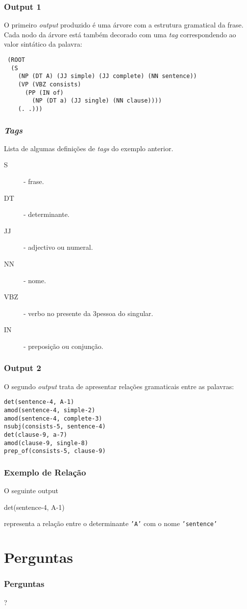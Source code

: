 \documentclass{beamer}
\begin{document}
\begin{frame}\frametitle{Output 1}
O primeiro \emph{output} produzido é uma árvore com a estrutura gramatical da frase. Cada nodo da árvore está também decorado com
uma \emph{tag} correspondendo ao valor sintático da palavra:\\
\begin{lstlisting}
 (ROOT
  (S
    (NP (DT A) (JJ simple) (JJ complete) (NN sentence))
    (VP (VBZ consists)
      (PP (IN of)
        (NP (DT a) (JJ single) (NN clause))))
    (. .)))
\end{lstlisting}
\end{frame}

\begin{frame}\frametitle{\emph{Tags}}
Lista de algumas definições de \emph{tags} do exemplo anterior.\\
 \begin{description}
  \item [S] - frase.
  \item [DT] - determinante.
  \item [JJ] - adjectivo ou numeral.
  \item [NN] - nome.
  \item [VBZ] - verbo no presente da 3\ª pessoa do singular.
  \item [IN] - preposição ou conjunção.
 \end{description}
\end{frame}

\begin{frame}\frametitle{Output 2}
 O segundo \emph{output} trata de apresentar relações gramaticais entre as palavras:

\begin{lstlisting}
det(sentence-4, A-1)
amod(sentence-4, simple-2)
amod(sentence-4, complete-3)
nsubj(consists-5, sentence-4)
det(clause-9, a-7)
amod(clause-9, single-8)
prep_of(consists-5, clause-9)
\end{lstlisting}

\end{frame}

\begin{frame}\frametitle{Exemplo de Relação}
  O seguinte output
 \begin{block}
  det(sentence-4, A-1)
 \end{block}
  representa a relação entre o determinante \texttt{'A'} com o nome \texttt{'sentence'}

\end{frame}


\section*{Perguntas}
\begin{frame} \frametitle{Perguntas}
\begin{center}\huge{?}\end{center}
\end{frame}
\end{document}
